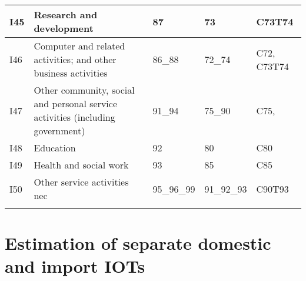 \documentclass[12pt,english]{article}
\begin{document}
\begin{table}[ht]
\begin{adjustbox}{width=\textwidth}
\begin{tabular}{lp{500pt}lll}
		I45 & Research and development  & 87 & 73 & C73T74 \\ \midrule
		I46 & Computer and related activities; and other business activities & 86\_88 & 72\_74 & C72, C73T74 \\ \midrule
		I47 & Other community, social and personal service activities (including government) & 91\_94 & 75\_90 & C75,  \\ \midrule
		I48 & Education & 92 & 80 & C80 \\ \midrule
		I49 & Health and social work & 93 & 85 & C85 \\ \midrule
		I50 & Other service activities nec & 95\_96\_99 & 91\_92\_93 & C90T93 \\
		\arrayrulecolor{black}\bottomrule	
	\end{tabular}
	\end{adjustbox}
	\thispagestyle{empty}
\end{table}

\clearpage
\section{Estimation of separate domestic and import IOTs}\label{IOTopti}
\end{document}
